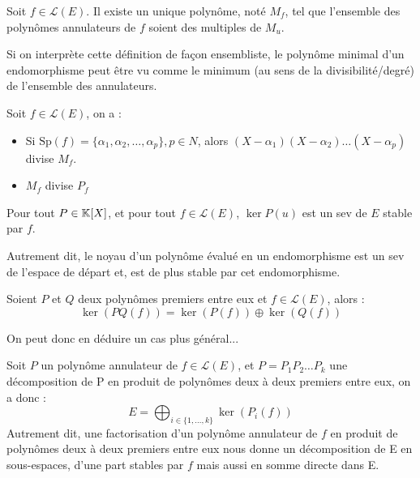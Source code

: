 \begin{definition}
    Soit $f \in \mathcal{L}(E)$. Il existe un unique polynôme, noté $M_f$, tel que l'ensemble des polynômes annulateurs 
    de $f$ soient des multiples de $M_u$. 

    \vspace{0.3cm}

    Si on interprète cette définition de façon ensembliste, le polynôme minimal d'un endomorphisme peut être vu 
    comme le minimum (au sens de la divisibilité/degré) de l'ensemble des annulateurs. 
\end{definition}

\begin{proposition}
    Soit $f \in \mathcal{L}(E)$, on a :
    \begin{itemize}
        \item Si $\text{Sp}(f) = \{\alpha_1, \alpha_2, \dots, \alpha_p\}, p \in N$, alors $(X - \alpha_1)(X - \alpha_2) \dots (X - \alpha_p)$ divise $M_f$.
        \item $M_f$ divise $P_f$
    \end{itemize}
\end{proposition}


\begin{prop}
    Pour tout $P \in \mathbb{K}[X]$, et pour tout $f \in \mathcal{L}(E)$, $\ker P(u)$ est un sev de $E$ stable par $f$. 

    \vspace{0.3cm}

    Autrement dit, le noyau d'un polynôme évalué en un endomorphisme est un sev de l'espace de départ et, est de plus stable par cet endomorphisme. 
\end{prop}

\begin{lemma}[Noyaux]
    Soient $P$ et $Q$ deux polynômes premiers entre eux et $f \in \mathcal{L}(E)$, alors :
        \[ \boxed{\ker (PQ(f)) = \ker(P(f)) \oplus \ker(Q(f))} \] 
\end{lemma}

On peut donc en déduire un cas plus général... 

\begin{theorem}
    Soit $P$ un polynôme annulateur de $f \in \mathcal{L}(E)$, et $P = P_1P_2 \dots P_k$ une décomposition de P en produit de polynômes 
    deux à deux premiers entre eux, on a donc :
        \[E = \bigoplus_{i \in \{1,\dots, k\}} \ker (P_i(f))\]
    Autrement dit, une factorisation d'un polynôme annulateur de $f$ en produit de polynômes deux à deux premiers entre eux 
    nous donne un décomposition de E en sous-espaces, d'une part stables par $f$ mais aussi en somme directe dans E. 
\end{theorem}

